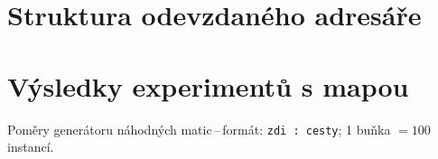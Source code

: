 
%






\chapter{Struktura odevzdaného adresáře}\label{chap:file_directory}

\chapter{Výsledky experimentů s mapou}\label{chap:map_experiments}
Poměry generátoru náhodných matic\,--\,formát: \verb|zdi : cesty|; 1 buňka $= 100$ instancí.

